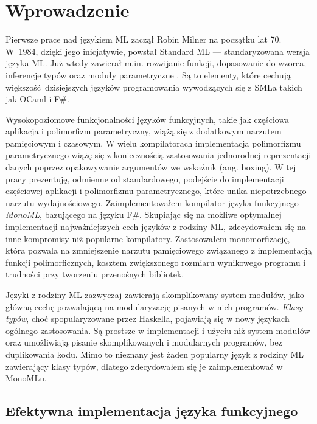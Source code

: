 \documentclass[declaration,shortabstract]{iithesis}
\author         {Mateusz Lewko}
\date           {}                     %
\begin{document}

\chapter{Wprowadzenie}

Pierwsze prace nad językiem ML zaczął Robin Milner na początku lat 70. W~1984, 
dzięki jego inicjatywie, powstał Standard ML --- standaryzowana wersja języka 
ML. Już wtedy zawierał m.in. rozwijanie funkcji, dopasowanie do wzorca, 
inferencje typów oraz moduły parametryczne \cite{sml_proposal}. Są to elementy,
które cechują większość dzisiejszych języków programowania 
wywodzących się z SMLa takich jak OCaml i F\#. 

Wysokopoziomowe funkcjonalności
języków funkcyjnych, takie jak częściowa aplikacja i polimorfizm parametryczny, 
wiążą się z dodatkowym narzutem pamięciowym i czasowym. W wielu kompilatorach 
implementacja polimorfizmu parametrycznego wiążę się z koniecznością 
zastosowania jednorodnej reprezentacji danych poprzez opakowywanie argumentów 
we wskaźnik (ang. boxing). W tej pracy prezentuję, odmienne od standardowego,
podejście do implementacji częściowej aplikacji i polimorfizmu parametrycznego, 
które unika niepotrzebnego narzutu wydajnościowego. Zaimplementowałem kompilator 
języka funkcyjnego \textit{MonoML}, bazującego na języku F\#. 
Skupiając się na możliwe optymalnej implementacji najważniejszych cech języków 
z rodziny ML, zdecydowałem się na inne kompromisy niż popularne kompilatory. 
Zastosowałem monomorfizację, która pozwala na zmniejszenie narzutu pamięciowego 
związanego z implementacją funkcji polimorficznych, kosztem zwiększonego 
rozmiaru wynikowego programu i trudności przy tworzeniu przenośnych 
bibliotek.

Języki z rodziny ML zazwyczaj zawierają skomplikowany system modułów, jako 
główną cechę pozwalającą na modularyzację pisanych w nich programów.
\textit{Klasy typów}, choć spopularyzowane przez Haskella, pojawiają
się w nowy językach ogólnego zastosowania. Są prostsze w implementacji
i użyciu niż system modułów oraz umożliwiają pisanie skomplikowanych i modularnych 
programów, bez duplikowania kodu. Mimo to nieznany jest żaden 
popularny język z rodziny ML zawierający klasy typów, dlatego zdecydowałem się je 
zaimplementować w MonoMLu.


\section{Efektywna implementacja języka funkcyjnego}
\end{document}
